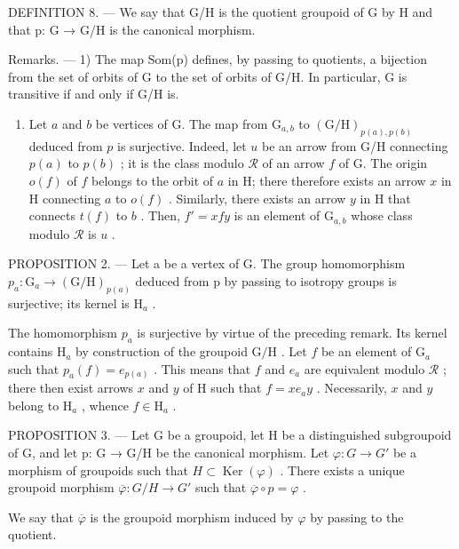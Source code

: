 DEFINITION 8. --- We say that G/H is the quotient groupoid of G by H and that p: G → G/H is the canonical morphism.

Remarks. --- 1) The map Som(p) defines, by passing to quotients, a bijection from the set of orbits of G to the set of orbits of G/H. In particular, G is transitive if and only if G/H is.

\begin{enumerate}
\def\labelenumi{\arabic{enumi})}
\setcounter{enumi}{1}
\tightlist
\item
  Let \(a\) and \(b\) be vertices of G. The map from \(\mathrm{G}_{a,b}\) to \((\mathrm{G} / \mathrm{H})_{p(a),p(b)}\) deduced from \(p\) is surjective. Indeed, let \(u\) be an arrow from G/H connecting \(p(a)\) to \(p(b)\) ; it is the class modulo \(\mathcal{R}\) of an arrow \(f\) of G. The origin \(o(f)\) of \(f\) belongs to the orbit of \(a\) in H; there therefore exists an arrow \(x\) in H connecting \(a\) to \(o(f)\) . Similarly, there exists an arrow \(y\) in H that connects \(t(f)\) to \(b\) . Then, \(f' = xfy\) is an element of \(\mathrm{G}_{a,b}\) whose class modulo \(\mathcal{R}\) is \(u\) .
\end{enumerate}

PROPOSITION 2. --- Let a be a vertex of G. The group homomorphism \(p_{a}\colon\mathrm{G}_{a}\to(\mathrm{G}/\mathrm{H})_{p(a)}\) deduced from p by passing to isotropy groups is surjective; its kernel is \(\mathrm{H}_{a}\) .

The homomorphism \(p_a\) is surjective by virtue of the preceding remark. Its kernel contains \(\mathrm{H}_a\) by construction of the groupoid \(\mathrm{G / H}\) . Let \(f\) be an element of \(\mathrm{G}_a\) such that \(p_a(f) = e_{p(a)}\) . This means that \(f\) and \(e_a\) are equivalent modulo \(\mathcal{R}\) ; there then exist arrows \(x\) and \(y\) of H such that \(f = xe_a y\) . Necessarily, \(x\) and \(y\) belong to \(\mathrm{H}_a\) , whence \(f \in \mathrm{H}_a\) .

PROPOSITION 3. --- Let G be a groupoid, let H be a distinguished subgroupoid of G, and let p: G → G/H be the canonical morphism. Let \(\varphi\colon G\to G'\) be a morphism of groupoids such that \(H\subset\operatorname{Ker}(\varphi)\) . There exists a unique groupoid morphism \(\overline{\varphi}\colon G/H\to G'\) such that \(\overline{\varphi}\circ p=\varphi\) .

We say that \(\overline{\varphi}\) is the groupoid morphism induced by \(\varphi\) by passing to the quotient.

